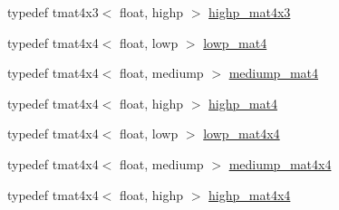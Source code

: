 \begin{DoxyCompactItemize}
typedef tmat4x3$<$ float, highp $>$ \hyperlink{namespaceglm_a0debb266459f3bd097d3f7b3651b473e}{highp\+\_\+mat4x3}
\item 
typedef tmat4x4$<$ float, lowp $>$ \hyperlink{namespaceglm_a94b6d2ed8f4c62bc72ce3c64dcfcbbad}{lowp\+\_\+mat4}
\item 
typedef tmat4x4$<$ float, mediump $>$ \hyperlink{namespaceglm_a16b7f3efa843e157a6d8c93acbb432c9}{mediump\+\_\+mat4}
\item 
typedef tmat4x4$<$ float, highp $>$ \hyperlink{namespaceglm_a02c04d7446add824728c372fd5a4adaf}{highp\+\_\+mat4}
\item 
typedef tmat4x4$<$ float, lowp $>$ \hyperlink{namespaceglm_a8045c48adb60a799b49b05d48e3b182e}{lowp\+\_\+mat4x4}
\item 
typedef tmat4x4$<$ float, mediump $>$ \hyperlink{namespaceglm_a8f7eeb38136787454a3a0fe6586d990b}{mediump\+\_\+mat4x4}
\item 
typedef tmat4x4$<$ float, highp $>$ \hyperlink{namespaceglm_a41d9d374f7dddfb5fa0eccdf09c3eb21}{highp\+\_\+mat4x4}
\end{DoxyCompactItemize}
